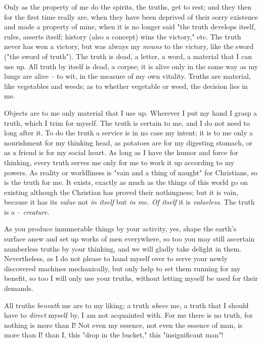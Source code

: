 \documentclass[a4paper]{book}
\begin{document}
Only as the property of me do the spirits, the truths, get to rest; and they 
then for the first time really are, when they have been deprived of their 
sorry existence and made a property of mine, when it is no longer said "{}the 
truth develops itself, rules, asserts itself; history (also a concept) wins 
the victory,"{} etc. The truth never has won a victory, but was always my 
\textit{means} to the victory, like the sword ("{}the sword of truth"{}). The 
truth is dead, a letter, a word, a material that I can use up. All truth by 
itself is dead, a corpse; it is alive only in the same way as my lungs are 
alive -- to wit, in the measure of my own vitality. Truths are material, like 
vegetables and weeds; as to whether vegetable or weed, the decision lies in 
me.

Objects are to me only material that I use up. Wherever I put my hand I grasp 
a truth, which I trim for myself. The truth is certain to me, and I do not 
need to long after it. To do the truth a service is in no case my intent; it 
is to me only a nourishment for my thinking head, as potatoes are for my 
digesting stomach, or as a friend is for my social heart. As long as I have 
the humor and force for thinking, every truth serves me only for me to work it 
up according to my powers. As reality or worldliness is "{}vain and a thing of 
naught"{} for Christians, so is the truth for me. It exists, exactly as much 
as the things of this world go on existing although the Christian has proved 
their nothingness; but it is vain, because it has its \textit{value} not 
\textit{in itself} but \textit{in me. Of itself} it is \textit{valueless}. The 
truth is a -- \textit{creature}.

As you produce innumerable things by your activity, yes, shape the earth's 
surface anew and set up works of men everywhere, so too you may still 
ascertain numberless truths by your thinking, and we will gladly take delight 
in them. Nevertheless, as I do not please to hand myself over to serve your 
newly discovered machines mechanically, but only help to set them running for 
my benefit, so too I will only use your truths, without letting myself be used 
for their demands.

All truths \textit{beneath} me are to my liking; a truth \textit{above} me, a 
truth that I should have to \textit{direct} myself by, I am not acquainted 
with. For me there is no truth, for nothing is more than I! Not even my 
essence, not even the essence of man, is more than I! than I, this "{}drop in 
the bucket,"{} this "{}insignificant man"{}!
\end{document}
